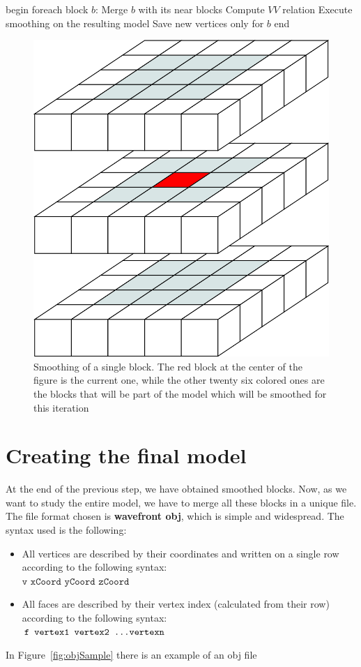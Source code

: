 \begin{pseudo}[caption={Smoothing of a block}, label={lst:blockSmoothing}]
begin
  foreach block $b$:
    Merge $b$ with its near blocks
    Compute $VV$ relation
    Execute smoothing on the resulting model
    Save new vertices only for $b$
end
\end{pseudo}

\begin{figure}[htb] %
   \centering
   \includegraphics[width=0.25\linewidth]{images/SmoothingBlocks.png}
   \caption[Smoothing of a single block]{Smoothing of a single block. The red block at the center of the figure is the current one, while the other twenty six colored ones are the blocks that will be part of the model which will be smoothed for this iteration}
   \label{fig:SmoothingBlocks}
\end{figure}

\section{Creating the final model}\label{sec33:FinalModel}

At the end of the previous step, we have obtained smoothed blocks. Now, as we want to study the entire model, we have to merge all these blocks in a unique file. The file format chosen is \textbf{wavefront obj}, which is simple and widespread. The syntax used is the following:

\begin{itemize}
 \item All vertices are described by their coordinates and written on a single row according to the following syntax:\\ $\texttt{v xCoord yCoord zCoord}$
 \item All faces are described by their vertex index (calculated from their row) according to the following syntax:\\ $\texttt{f vertex1 vertex2 \dots vertexn}$
\end{itemize}

In Figure~\ref{fig:objSample} there is an example of an obj file

